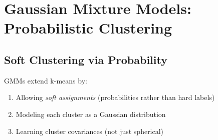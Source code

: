 \section{Gaussian Mixture Models: Probabilistic Clustering}

\subsection{Soft Clustering via Probability}

GMMs extend k-means by:
\begin{enumerate}
    \item Allowing \textit{soft assignments} (probabilities rather than hard labels)
    \item Modeling each cluster as a Gaussian distribution
    \item Learning cluster covariances (not just spherical)
\end{enumerate}

